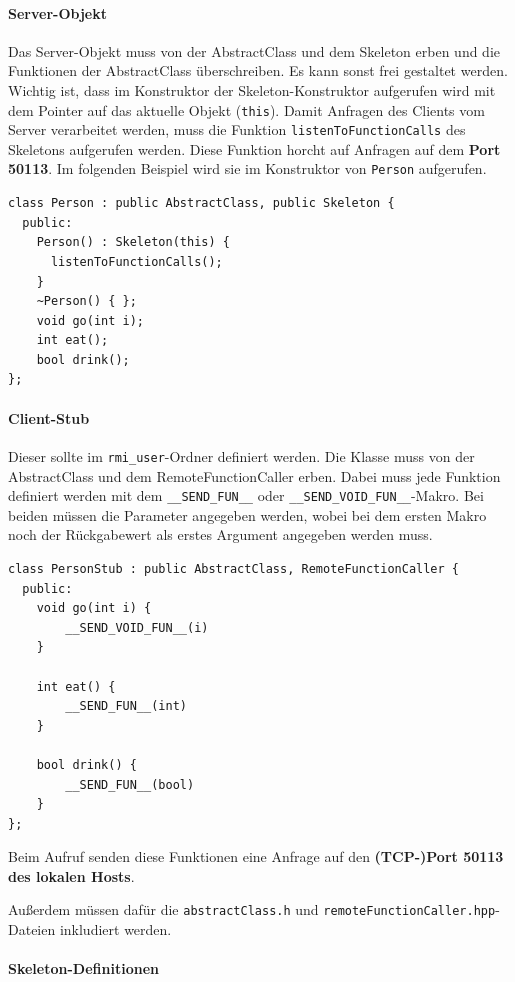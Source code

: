 \documentclass[a4paper,oneside,10pt]{report}
\begin{document}
\paragraph{Server-Objekt} Das Server-Objekt muss von der AbstractClass und dem Skeleton erben und die Funktionen der AbstractClass überschreiben. Es kann sonst frei gestaltet werden. Wichtig ist, dass im Konstruktor der Skeleton-Konstruktor aufgerufen wird mit dem Pointer auf das aktuelle Objekt (\texttt{this}). Damit Anfragen des Clients vom Server verarbeitet werden, muss die Funktion \texttt{listenToFunctionCalls} des Skeletons aufgerufen werden. Diese Funktion horcht auf Anfragen auf dem \textbf{Port 50113}. Im folgenden Beispiel wird sie im Konstruktor von \texttt{Person} aufgerufen.

\begin{lstlisting}
class Person : public AbstractClass, public Skeleton {
  public:
    Person() : Skeleton(this) {
      listenToFunctionCalls();
    }
    ~Person() { };
    void go(int i);
    int eat();
    bool drink();
};
\end{lstlisting}

\paragraph{Client-Stub} Dieser sollte im \texttt{rmi\_user}-Ordner definiert werden. Die Klasse muss von der AbstractClass und dem RemoteFunctionCaller erben. Dabei muss jede Funktion definiert werden mit dem \texttt{\_\_SEND\_FUN\_\_} oder \texttt{\_\_SEND\_VOID\_FUN\_\_}-Makro. Bei beiden müssen die Parameter angegeben werden, wobei bei dem ersten Makro noch der Rückgabewert als erstes Argument angegeben werden muss. 

\begin{lstlisting}
class PersonStub : public AbstractClass, RemoteFunctionCaller {
  public:
    void go(int i) {
        __SEND_VOID_FUN__(i)
    }

    int eat() {
        __SEND_FUN__(int)
    }

    bool drink() {
        __SEND_FUN__(bool)
    }
};
\end{lstlisting}

Beim Aufruf senden diese Funktionen eine Anfrage auf den \textbf{(TCP-)Port 50113 des lokalen Hosts}.

Außerdem müssen dafür die \texttt{abstractClass.h} und \texttt{remoteFunctionCaller.hpp}-Dateien inkludiert werden. 

\paragraph{Skeleton-Definitionen} \label{abstractMethods}
\end{document}
